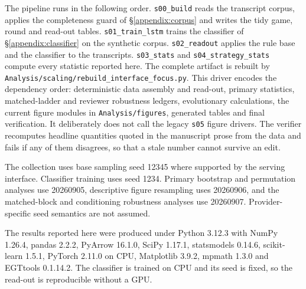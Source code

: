 \documentclass[11pt,a4paper]{article}
\begin{document}
The pipeline runs in the following order. \texttt{s00\_build} reads the transcript corpus, applies the completeness guard of \S\ref{appendix:corpus} and writes the tidy game, round and read-out tables. \texttt{s01\_train\_lstm} trains the classifier of \S\ref{appendix:classifier} on the synthetic corpus. \texttt{s02\_readout} applies the rule base and the classifier to the transcripts. \texttt{s03\_stats} and \texttt{s04\_strategy\_stats} compute every statistic reported here. The complete artifact is rebuilt by \texttt{Analysis/\allowbreak scaling/\allowbreak rebuild\_interface\_focus.py}. This driver encodes the dependency order: deterministic data assembly and read-out, primary statistics, matched-ladder and reviewer robustness ledgers, evolutionary calculations, the current figure modules in \texttt{Analysis/figures}, generated tables and final verification. It deliberately does not call the legacy \texttt{s05} figure drivers. The verifier recomputes headline quantities quoted in the manuscript prose from the data and fails if any of them disagrees, so that a stale number cannot survive an edit.

The collection uses base sampling seed 12345 where supported by the serving interface. Classifier training uses seed 1234. Primary bootstrap and permutation analyses use 20260905, descriptive figure resampling uses 20260906, and the matched-block and conditioning robustness analyses use 20260907. Provider-specific seed semantics are not assumed.

The results reported here were produced under Python 3.12.3 with NumPy 1.26.4, pandas 2.2.2, PyArrow 16.1.0, SciPy 1.17.1, statsmodels 0.14.6, scikit-learn 1.5.1, PyTorch 2.11.0 on CPU, Matplotlib 3.9.2, mpmath 1.3.0 and EGTtools 0.1.14.2. The classifier is trained on CPU and its seed is fixed, so the read-out is reproducible without a GPU.
\end{document}
